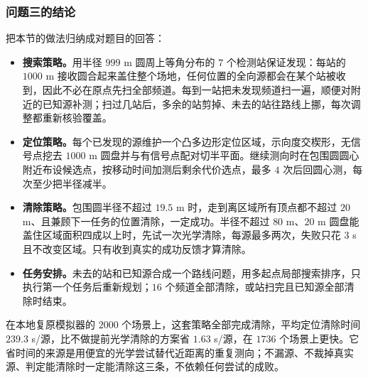 \subsubsection{问题三的结论}\label{sec:q3-5}

把本节的做法归纳成对题目的回答：

\begin{itemize}
\item \textbf{搜索策略。}用半径 $999$ m 圆周上等角分布的 $7$ 个检测站保证发现：每站的 $1000$ m 接收圆合起来盖住整个场地，任何位置的全向源都会在某个站被收到，因此不必在原点先扫全部频道。每到一站把未发现频道扫一遍，顺便对附近的已知源补测；扫过几站后，多余的站剪掉、未去的站往路线上挪，每次调整都重新核验覆盖。
\item \textbf{定位策略。}每个已发现的源维护一个凸多边形定位区域，示向度交楔形，无信号点挖去 $1000$ m 圆盘并与有信号点配对切半平面。继续测向时在包围圆圆心附近布设候选点，按移动时间加测后剩余代价选点，最多 $4$ 次后回圆心测，每次至少把半径减半。
\item \textbf{清除策略。}包围圆半径不超过 $19.5$ m 时，走到离区域所有顶点都不超过 $20$ m、且兼顾下一任务的位置清除，一定成功。半径不超过 $80$ m、$20$ m 圆盘能盖住区域面积四成以上时，先试一次光学清除，每源最多两次，失败只花 $3$ s 且不改变区域。只有收到真实的成功反馈才算清除。
\item \textbf{任务安排。}未去的站和已知源合成一个路线问题，用多起点局部搜索排序，只执行第一个任务后重新规划；$16$ 个频道全部清除，或站扫完且已知源全部清除时结束。
\end{itemize}

在本地复原模拟器的 $2000$ 个场景上，这套策略全部完成清除，平均定位清除时间 $239.3$ s/源，比不做提前光学清除的方案省 $1.63$ s/源，在 $1736$ 个场景上更快。它省时间的来源是用便宜的光学尝试替代近距离的重复测向；不漏源、不裁掉真实源、判定能清除时一定能清除这三条，不依赖任何尝试的成败。
